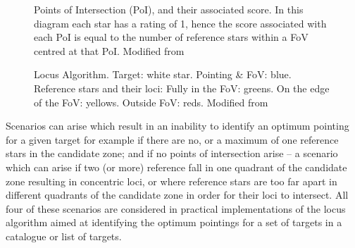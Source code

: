 \documentclass{aa}
\begin{document}
\begin{figure}[!htb]
\caption{\label{PoIscores}Points of Intersection (PoI), and their associated
score. In this diagram each star has a rating of 1, hence the score
associated with each PoI is equal to the number of reference stars
within a FoV centred at that PoI. Modified from \citet{creaner2016thesis}}
\end{figure}

\begin{figure}[!htb]
\caption{\label{final}Locus Algorithm. Target: white star. Pointing \& FoV:
blue. Reference stars and their loci: Fully in the FoV: greens. On the
edge of the FoV: yellows. Outside FoV: reds.  Modified from \citet{creaner2016thesis}}
\end{figure}

Scenarios can arise which result in an inability to identify an optimum
pointing for a given target for example if there are no, or a maximum of
one reference stars in the candidate zone; and if no points of
intersection arise -- a scenario which can arise if two (or more)
reference fall in one quadrant of the candidate zone resulting in
concentric loci, or where reference stars are too far apart in different
quadrants of the candidate zone in order for their loci to intersect.
All four of these scenarios are considered in practical implementations
of the locus algorithm aimed at identifying the optimum pointings for a
set of targets in a catalogue or list of targets.
\end{document}
